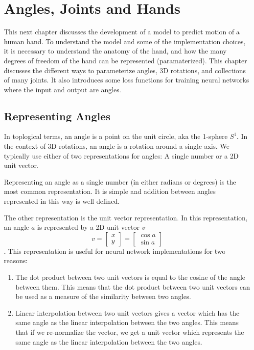 \chapter{Angles, Joints and Hands}
\label{C:angles-joints-hands}

This next chapter discusses the development of a model to predict motion of a human hand. To understand the model and some of the implementation choices, it is necessary to understand the anatomy of the hand, and how the many degrees of freedom of the hand can be represented (paramaterized). This chapter discusses the different ways to parameterize angles, 3D rotations, and collections of many joints. It also introduces some loss functions for training neural networks where the input and output are angles.

\section{Representing Angles}

In toplogical terms, an angle is a point on the unit circle, aka the 1-sphere $S^1$. In the context of 3D rotations, an angle is a rotation around a single axis. We typically use either of two representations for angles: A single number or a 2D unit vector.

Representing an angle as a single number (in either radians or degrees) is the most common representation. It is simple and addition between angles represented in this way is well defined.

The other representation is the unit vector representation. In this representation, an angle $a$ is represented by a 2D unit vector $v$
\begin{equation}
    v = \begin{bmatrix}x \\ y\end{bmatrix} = \begin{bmatrix}\cos{a} \\ \sin{a}\end{bmatrix}
\end{equation}.
This representation is useful for neural network implementations for two reasons:
\begin{enumerate}
    \item The dot product between two unit vectors is equal to the cosine of the angle between them. This means that the dot product between two unit vectors can be used as a measure of the similarity between two angles.
    \item Linear interpolation between two unit vectors gives a vector which has the same angle as the linear interpolation between the two angles. This means that if we re-normalize the vector, we get a unit vector which represents the same angle as the linear interpolation between the two angles.
\end{enumerate}


